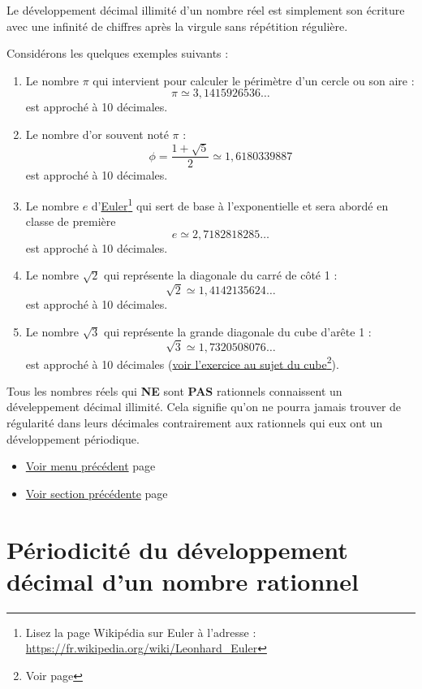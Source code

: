 \documentclass[a4paper,11pt]{book}
\begin{document}
Le développement décimal illimité
d'un nombre réel est simplement son écriture avec une infinité de
chiffres après la virgule sans répétition régulière.

\clearpage

Considérons les quelques exemples suivants :

\begin{enumerate}
\item Le nombre \(\pi\) qui intervient pour calculer le périmètre
d'un cercle ou son aire : \[\pi \simeq 3,1415926536\dots\] est
approché à 10 décimales.
\item Le nombre d'or souvent noté \(\pi\) : \[\phi = \dfrac{1 +
       \sqrt{5}}{2} \simeq 1,6180339887\] est approché à 10 décimales.
\item Le nombre \(e\) d'\href{https://fr.wikipedia.org/wiki/Leonhard\_Euler}{Euler}\footnote{Lisez la page Wikipédia sur Euler à l'adresse :
\url{https://fr.wikipedia.org/wiki/Leonhard\_Euler}} qui sert de base à
l'exponentielle et sera abordé en classe de première
\[e \simeq 2,7182818285\dots\]
est approché à 10 décimales.
\item Le nombre \(\sqrt{2}\) qui représente la diagonale du carré de
côté 1 : \[\sqrt{2} \simeq 1,4142135624\dots\]
est approché à 10 décimales.
\item Le nombre \(\sqrt{3}\) qui représente la grande diagonale du
cube d'arête 1 : \[\sqrt{3} \simeq 1,7320508076\dots\]
est approché à 10 décimales (\hyperref[org1486a04]{voir l'exercice au sujet du cube}\footnote{Voir page \pageref{page:sec2.6.5exo11}}).
\end{enumerate}



\clearpage

Tous les nombres réels qui \textbf{NE} sont \textbf{PAS} rationnels connaissent
un déveleppement décimal illimité. Cela signifie qu'on ne pourra
jamais trouver de régularité dans leurs décimales contrairement
aux rationnels qui eux ont un développement périodique.


\begin{itemize}
\item \hyperref[org82a5705]{Voir menu précédent}
page~\pageref{page:deeps-menu}
\item \hyperref[org1e7ea68]{Voir section précédente}
page~\pageref{page:sec6.1review}
\end{itemize}


\clearpage

\section{Périodicité du développement décimal d'un nombre rationnel}
\label{sec:orgd80a238}
\end{document}
